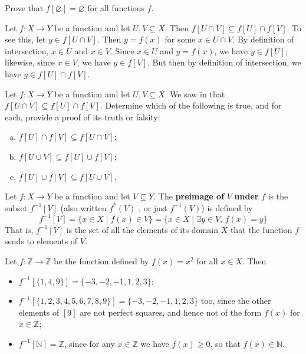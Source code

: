 \begin{exercise}
Prove that $f[\varnothing] = \varnothing$ for all functions $f$.
\end{exercise}

\begin{example}
\label{exImageOfIntersectionSubsetIntersectionOfImage}
Let $f : X \to Y$ be a function and let $U, V \subseteq X$. Then $f[U \cap V] \subseteq f[U] \cap f[V]$. To see this, let $y \in f[U \cap V]$. Then $y = f(x)$ for some $x \in U \cap V$. By definition of intersection, $x \in U$ and $x \in V$. Since $x \in U$ and $y=f(x)$, we have $y \in f[U]$; likewise, since $x \in V$, we have $y \in f[V]$. But then by definition of intersection, we have $y \in f[U] \cap f[V]$.
\end{example}

\begin{exercise}
Let $f : X \to Y$ be a function and let $U, V \subseteq X$. We saw in  that $f[U \cap V] \subseteq f[U] \cap f[V]$. Determine which of the following is true, and for each, provide a proof of its truth or falsity:
\begin{enumerate}[(a)]
\item $f[U] \cap f[V] \subseteq f[U \cap V]$;
\item $f[U \cup V] \subseteq f[U] \cup f[V]$;
\item $f[U] \cup f[V] \subseteq f[U \cup V]$.
\end{enumerate}
\end{exercise}

\begin{definition}
\label{defPreimage}
Let $f : X \to Y$ be a function and let $V \subseteq Y$. The \textbf{preimage of} $V$ \textbf{under} $f$ is the subset $f^{-1}[V]$  (also written $f^*(V)$ , or just $f^{-1}(V)$) is defined by
\[ f^{-1}[V] = \{ x \in X \mid f(x) \in V \} = \{ x \in X \mid \exists y \in V,\, f(x) = y \} \]
That is, $f^{-1}[V]$ is the set of all the elements of its domain $X$ that the function $f$ sends to elements of $V$.
\end{definition}

\begin{example}
Let $f : \mathbb{Z} \to \mathbb{Z}$ be the function defined by $f(x)=x^2$ for all $x \in X$. Then
\begin{itemize}
\item $f^{-1}[ \{ 1, 4, 9 \} ] = \{ -3, -2, -1, 1, 2, 3 \}$;
\item $f^{-1}[ \{ 1, 2, 3, 4, 5, 6, 7, 8, 9 \} ] =  \{ -3, -2, -1, 1, 2, 3 \}$ too, since the other elements of $[9]$ are not perfect squares, and hence not of the form $f(x)$ for $x \in \mathbb{Z}$;
\item $f^{-1}[\mathbb{N}] = \mathbb{Z}$, since for any $x \in \mathbb{Z}$ we have $f(x) \ge 0$, so that $f(x) \in \mathbb{N}$.
\end{itemize}
\end{example}

